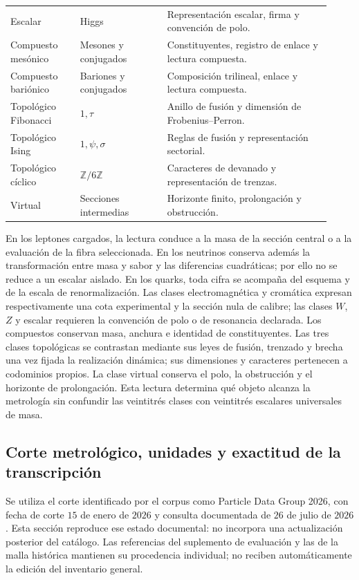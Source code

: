 \begin{table}[!htbp]
\begin{tabular}{p{0.20\linewidth}p{0.25\linewidth}p{0.47\linewidth}}
Escalar & Higgs & Representación escalar, firma y convención de polo.\\
Compuesto mesónico & Mesones y conjugados & Constituyentes, registro de enlace y lectura compuesta.\\
Compuesto bariónico & Bariones y conjugados & Composición trilineal, enlace y lectura compuesta.\\
Topológico Fibonacci & \(1,\tau\) & Anillo de fusión y dimensión de Frobenius--Perron.\\
Topológico Ising & \(1,\psi,\sigma\) & Reglas de fusión y representación sectorial.\\
Topológico cíclico & \(\mathbb Z/6\mathbb Z\) & Caracteres de devanado y representación de trenzas.\\
Virtual & Secciones intermedias & Horizonte finito, prolongación y obstrucción.\\
\bottomrule
\end{tabular}
\end{table}
\endgroup

En los leptones cargados, la lectura conduce a la masa de la sección central
o a la evaluación de la fibra seleccionada. En los neutrinos conserva además
la transformación entre masa y sabor y las diferencias cuadráticas; por ello
no se reduce a un escalar aislado. En los quarks, toda cifra se acompaña del
esquema y de la escala de renormalización. Las clases electromagnética y
cromática expresan respectivamente una cota experimental y la sección nula
de calibre; las clases \(W\), \(Z\) y escalar requieren la convención de polo
o de resonancia declarada. Los compuestos conservan masa, anchura e identidad
de constituyentes. Las tres clases topológicas se contrastan mediante sus
leyes de fusión, trenzado y brecha una vez fijada la realización dinámica;
sus dimensiones y caracteres pertenecen a codominios propios. La clase
virtual conserva el polo, la obstrucción y el horizonte de prolongación. Esta
lectura determina qué objeto alcanza la metrología sin confundir las
veintitrés clases con veintitrés escalares universales de masa.

\subsection{Corte metrológico, unidades y exactitud de la transcripción}
\label{subsec:vi-corte-metrologico}

Se utiliza el corte identificado por el corpus como Particle Data Group
2026, con fecha de corte \(15\) de enero de \(2026\) y consulta
documentada de \(26\) de julio de \(2026\). Esta sección reproduce ese
estado documental: no incorpora una actualización posterior del catálogo.
Las referencias del suplemento de evaluación y las de la malla histórica
mantienen su procedencia individual; no reciben automáticamente la edición
del inventario general.

